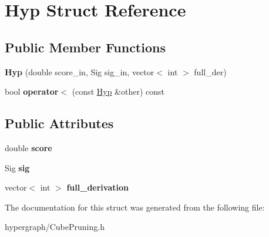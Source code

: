 \hypertarget{structHyp}{
\section{Hyp Struct Reference}
\label{structHyp}
}
\subsection*{Public Member Functions}
\begin{DoxyCompactItemize}
\item 
\hypertarget{structHyp_a5fba7860265cf935133e4c0c73fec090}{
{\bfseries Hyp} (double score\_\-in, Sig sig\_\-in, vector$<$ int $>$ full\_\-der)}
\label{structHyp_a5fba7860265cf935133e4c0c73fec090}

\item 
\hypertarget{structHyp_a547883a1aa9a7573d328d0f6b385dca8}{
bool {\bfseries operator$<$} (const \hyperlink{structHyp}{Hyp} \&other) const }
\label{structHyp_a547883a1aa9a7573d328d0f6b385dca8}

\end{DoxyCompactItemize}
\subsection*{Public Attributes}
\begin{DoxyCompactItemize}
\item 
\hypertarget{structHyp_a7d24c5a317140b8050dc57255bb7922a}{
double {\bfseries score}}
\label{structHyp_a7d24c5a317140b8050dc57255bb7922a}

\item 
\hypertarget{structHyp_a4aa96a03dc6b82416074985e0ecd39c3}{
Sig {\bfseries sig}}
\label{structHyp_a4aa96a03dc6b82416074985e0ecd39c3}

\item 
\hypertarget{structHyp_a076825f81d94a1f2b20bb5141eb9f4c7}{
vector$<$ int $>$ {\bfseries full\_\-derivation}}
\label{structHyp_a076825f81d94a1f2b20bb5141eb9f4c7}

\end{DoxyCompactItemize}


The documentation for this struct was generated from the following file:\begin{DoxyCompactItemize}
\item 
hypergraph/CubePruning.h\end{DoxyCompactItemize}
